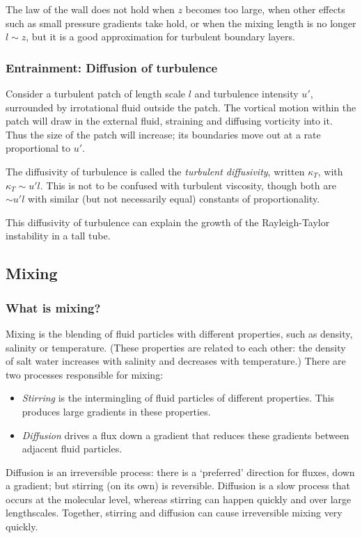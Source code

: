 The law of the wall does not hold when $z$ becomes too large, when other effects such as small pressure gradients take hold, or when the mixing length is no longer $l\sim z$, but it is a good approximation for turbulent boundary layers. 

\subsubsection{Entrainment: Diffusion of turbulence}

Consider a turbulent patch of length scale $l$ and turbulence intensity $u'$,
surrounded by irrotational fluid outside the patch. The vortical motion within
the patch will draw in the external fluid, straining and diffusing vorticity
into it. Thus the size of the patch will increase; its boundaries move out at a
rate proportional to $u'$. 

The diffusivity of turbulence is called the \textit{turbulent diffusivity},
written $\kappa_T$, with $\kappa_T \sim u'l$. This is not to be confused with
turbulent viscosity, though both are $\sim u'l$ with similar (but not
necessarily equal) constants of proportionality.

This diffusivity of turbulence can explain the growth of the Rayleigh-Taylor
instability in a tall tube. 

\subsection{Mixing}

\subsubsection{What is mixing?}

Mixing is the blending of fluid particles with different properties, such as density, salinity or temperature. (These properties are related to each other: the density of salt water increases with salinity and decreases with temperature.) There are two processes responsible for mixing:
\begin{itemize}
    \item \textit{Stirring} is the intermingling of fluid particles of different properties. This produces large gradients in these properties.
    \item \textit{Diffusion} drives a flux down a gradient that reduces these gradients between adjacent fluid particles.
\end{itemize}
Diffusion is an irreversible process: there is a `preferred' direction for fluxes, down a gradient; but stirring (on its own) is reversible. Diffusion is a slow process that occurs at the molecular level, whereas stirring can happen quickly and over large lengthscales. Together, stirring and diffusion can cause irreversible mixing very quickly.

